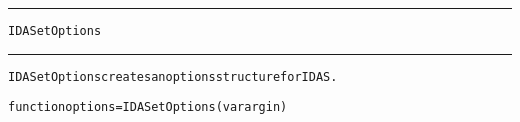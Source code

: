 \begin{samepage}
\hrule
\begin{center}
{\large \verb!IDASetOptions!}
\label{p:IDASetOptions}
\end{center}
\hrule\vspace{0.1in}



\begin{alltt}
IDASetOptions creates an options structure for IDAS.
\end{alltt}

\end{samepage}



\begin{samepage}


\begin{alltt}
function options = IDASetOptions(varargin) 
\end{alltt}

\end{samepage}



